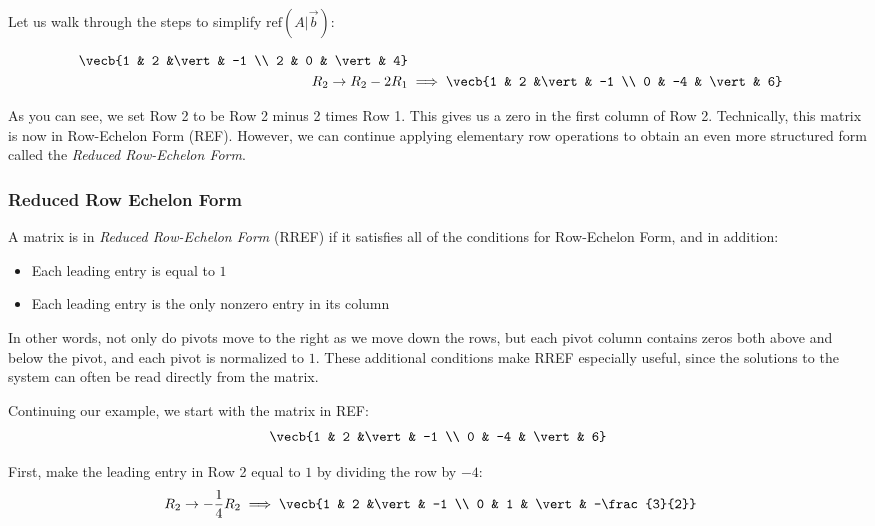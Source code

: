 Let us walk through the steps to simplify $\text{ref}(A\vert \vec{b})$:

\begin{align*}
\vecb{1 & 2 &\vert & -1 \\ 2 & 0 & \vert & 4} \\
R_2 \rightarrow R_2 - 2R_1 &\implies \vecb{1 & 2 &\vert & -1 \\ 0 & -4 & \vert & 6} \\
\end{align*}

As you can see, we set Row 2 to be Row 2 minus 2 times Row 1. This gives us a zero in the first column of Row 2. Technically, this matrix is now in Row-Echelon Form (REF). However, we can continue applying elementary row operations to obtain an even more structured form called the \emph{Reduced Row-Echelon Form}.

\subsubsection{Reduced Row Echelon Form}
A matrix is in \emph{Reduced Row-Echelon Form} (RREF) if it satisfies all of the conditions for Row-Echelon Form, and in addition:

\begin{itemize}
\item Each leading entry is equal to $1$
\item Each leading entry is the only nonzero entry in its column
\end{itemize}

In other words, not only do pivots move to the right as we move down the rows, but each pivot column contains zeros both above and below the pivot, and each pivot is normalized to $1$. These additional conditions make RREF especially useful, since the solutions to the system can often be read directly from the matrix.

Continuing our example, we start with the matrix in REF:
\begin{align*}
\vecb{1 & 2 &\vert & -1 \\ 0 & -4 & \vert & 6}
\end{align*}

First, make the leading entry in Row 2 equal to $1$ by dividing the row by $-4$:
\begin{align*}
R_2 \rightarrow -\frac{1}{4}R_2 
&\implies 
\vecb{1 & 2 &\vert & -1 \\ 0 & 1 & \vert & -\frac{3}{2}}
\end{align*}

